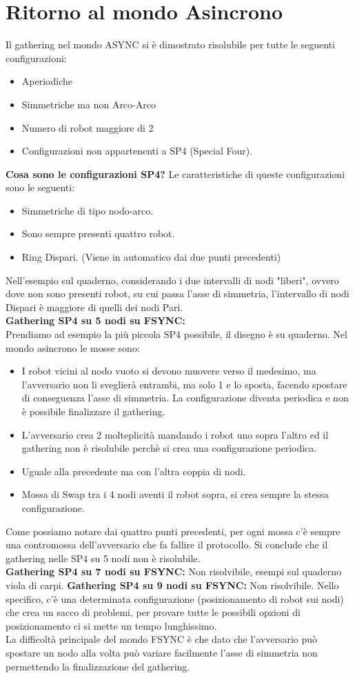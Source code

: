 \section{Ritorno al mondo Asincrono}
Il gathering nel mondo ASYNC si è dimostrato risolubile per tutte le seguenti configurazioni:
\begin{itemize}
    \item Aperiodiche
    \item Simmetriche ma non Arco-Arco
    \item Numero di robot maggiore di 2
    \item Configurazioni non appartenenti a SP4 (Special Four).
\end{itemize}
\textbf{Cosa sono le configurazioni SP4?} Le caratteristiche di queste configurazioni sono le seguenti:
\begin{itemize}
    \item Simmetriche di tipo nodo-arco.
    \item Sono sempre presenti quattro robot.
    \item Ring Dispari. (Viene in automatico dai due punti precedenti)
\end{itemize}{}
Nell'esempio sul quaderno, considerando i due intervalli di nodi "liberi", ovvero dove non sono presenti robot, su cui passa l'asse di simmetria, l'intervallo di nodi Dispari è maggiore di quelli dei nodi Pari.\\
\textbf{Gathering SP4 su 5 nodi su FSYNC:}\\
Prendiamo ad esempio la più piccola SP4 possibile, il disegno è su quaderno. Nel mondo asincrono le mosse sono:
\begin{itemize}
    \item I robot vicini al nodo vuoto si devono muovere verso il medesimo, ma l'avversario non li sveglierà entrambi, ma solo 1 e lo sposta, facendo spostare di conseguenza l'asse di simmetria. La configurazione diventa periodica e non è possibile finalizzare il gathering.
    \item L'avversario crea 2 molteplicità mandando i robot uno sopra l'altro ed il gathering non è risolubile perchè si crea una configurazione periodica.
    \item Uguale alla precedente ma con l'altra coppia di nodi.
    \item Mossa di Swap tra i 4 nodi aventi il robot sopra, si crea sempre la stessa configurazione.
\end{itemize}
Come possiamo notare dai quattro punti precedenti, per ogni mossa c'è sempre una contromossa dell'avversario che fa fallire il protocollo. Si conclude che il gathering nelle SP4 su 5 nodi non è risolubile.\\
\textbf{Gathering SP4 su 7 nodi su FSYNC:} Non risolvibile, esempi sul quaderno viola di carpi.
\textbf{Gathering SP4 su 9 nodi su FSYNC:} Non risolvibile.
Nello specifico, c'è una determinata configurazione (posizionamento di robot sui nodi) che crea un sacco di problemi, per provare tutte le possibili opzioni di posizionamento ci si mette un tempo lunghissimo.\\ La difficoltà principale del mondo FSYNC è che dato che l'avversario può spostare un nodo alla volta può variare facilmente l'asse di simmetria non permettendo la finalizzazione del gathering.
